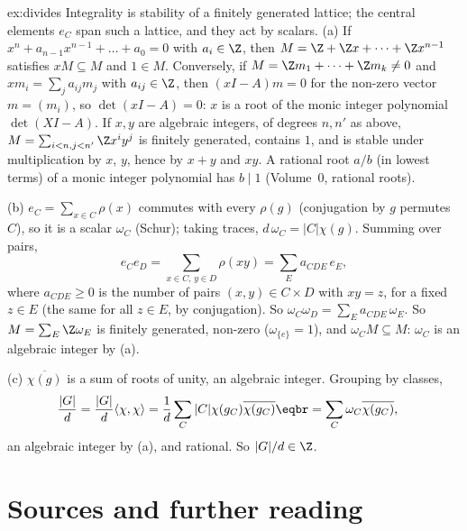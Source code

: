 \begin{solution}{ex:divides}
\idea Integrality is stability of a finitely generated lattice; the central elements $e_C$ span such a lattice, and they act by scalars.
\writeup (a) If $x^n+a_{n-1}x^{n-1}+\dots+a_0=0$ with $a_i\in\Z$, then $M=\Z+\Z x+\dots+\Z x^{n-1}$ satisfies $xM\subseteq M$ and $1\in M$. Conversely, if $M=\Z m_1+\dots+\Z m_k\ne0$ and $xm_i=\sum_ja_{ij}m_j$ with $a_{ij}\in\Z$, then $(xI-A)m=0$ for the non-zero vector $m=(m_i)$, so $\det(xI-A)=0$: $x$ is a root of the monic integer polynomial $\det(XI-A)$. If $x,y$ are algebraic integers, of degrees $n,n'$ as above, $M=\sum_{i<n,j<n'}\Z x^iy^j$ is finitely generated, contains $1$, and is stable under multiplication by $x$, $y$, hence by $x+y$ and $xy$. A rational root $a/b$ (in lowest terms) of a monic integer polynomial has $b\mid1$ (Volume~0, rational roots).

(b) $e_C=\sum_{x\in C}\rho(x)$ commutes with every $\rho(g)$ (conjugation by $g$ permutes $C$), so it is a scalar $\omega_C$ (Schur); taking traces, $d\,\omega_C=|C|\chi(g)$. Summing over pairs,
\[
e_Ce_D=\sum_{x\in C,\,y\in D}\rho(xy)=\sum_Ea_{CDE}\,e_E,
\]
where $a_{CDE}\ge0$ is the number of pairs $(x,y)\in C\times D$ with $xy=z$, for a fixed $z\in E$ (the same for all $z\in E$, by conjugation). So $\omega_C\omega_D=\sum_Ea_{CDE}\,\omega_E$. So $M=\sum_E\Z\omega_E$ is finitely generated, non-zero ($\omega_{\{e\}}=1$), and $\omega_CM\subseteq M$: $\omega_C$ is an algebraic integer by (a).

(c) $\overline{\chi(g)}$ is a sum of roots of unity, an algebraic integer. Grouping by classes,
\[
\begin{aligned}\frac{|G|}d=\frac{|G|}d\langle\chi,\chi\rangle&=\frac1d\sum_C|C|\chi(g_C)\overline{\chi(g_C)}\eqbr=\sum_C\omega_C\overline{\chi(g_C)},\end{aligned}
\]
an algebraic integer by (a), and rational. So $|G|/d\in\Z$.
\end{solution}

\section*{Sources and further reading}

